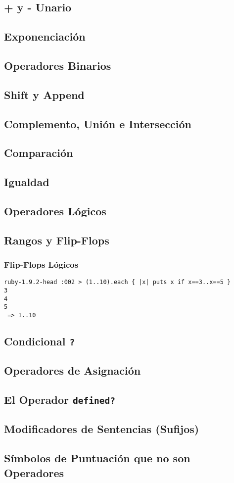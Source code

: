   \subsection{+ y - Unario}
  \subsection{Exponenciación}
  \subsection{Operadores Binarios}
  \subsection{Shift y Append}
  \subsection{Complemento, Unión e Intersección}
  \subsection{Comparación}
  \subsection{Igualdad}
  \subsection{Operadores Lógicos}
  \subsection{Rangos y Flip-Flops}
     \subsubsection{Flip-Flops Lógicos}
\begin{verbatim}
ruby-1.9.2-head :002 > (1..10).each { |x| puts x if x==3..x==5 }
3
4
5
 => 1..10 
\end{verbatim}
  \subsection{Condicional {\tt ?}}
  \subsection{Operadores de Asignación}
  \subsection{El Operador {\tt defined?}}
  \subsection{Modificadores de Sentencias (Sufijos)}
  \subsection{Símbolos de Puntuación que no son Operadores}
